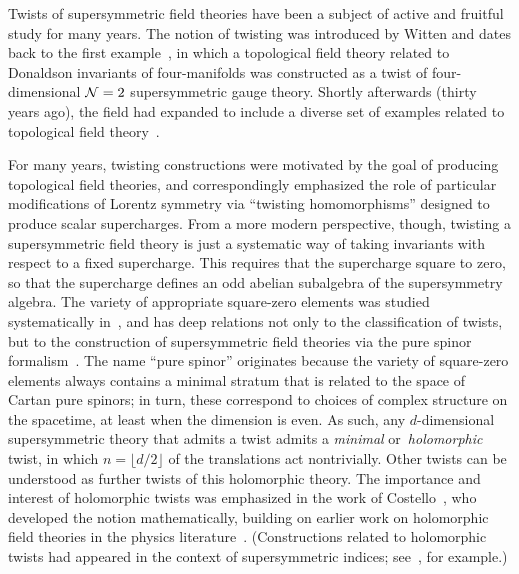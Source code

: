 %
%
%
%
%
%
%

Twists of supersymmetric field theories have been a subject of active and fruitful study for many years. 
The notion of twisting was introduced by Witten and dates back to the first example~\cite{WittenTwist}, in which a topological field theory related to Donaldson invariants of four-manifolds was constructed as a twist of four-dimensional $\mathcal N=2$ supersymmetric gauge theory.
Shortly afterwards (thirty years ago), the field had expanded to include a diverse set of examples related to topological field theory~\cite{BlauThompson}. 

For many years, twisting constructions were motivated by the goal of producing topological field theories, and correspondingly emphasized the role of particular modifications of  Lorentz symmetry via ``twisting homomorphisms'' designed to produce scalar supercharges.
From a more modern perspective, though, twisting a supersymmetric field theory is just a systematic way of taking invariants with respect to a fixed supercharge. This requires that the supercharge square to zero, so that the supercharge defines an odd abelian subalgebra of the supersymmetry algebra.
The variety of appropriate square-zero elements was studied systematically in~\cite{NV}, and has deep relations not only to the  classification of  twists, but to the construction  of supersymmetric field theories via the pure spinor formalism~\cite{Cederwall,EHSW}. The name ``pure spinor'' originates because the  variety of  square-zero elements always contains a minimal stratum that is related to the space of Cartan pure spinors; in turn, these correspond to choices of complex structure on the  spacetime, at least when the dimension is even. 
As such, any $d$-dimensional  supersymmetric theory that admits a twist admits a \emph{minimal} or~\emph{holomorphic} twist, in which $n=\lfloor d/2\rfloor$ of the translations act nontrivially. Other twists can be understood as further twists of this holomorphic theory.
The importance and interest of holomorphic twists was emphasized in the work of Costello~\cite{CostelloHol}, who developed the notion mathematically, building on earlier work on holomorphic field theories in the physics literature~\cite{NekThesis}. (Constructions related to holomorphic twists had appeared in the context of supersymmetric indices; see~\cite{Romelsberger}, for example.) 

